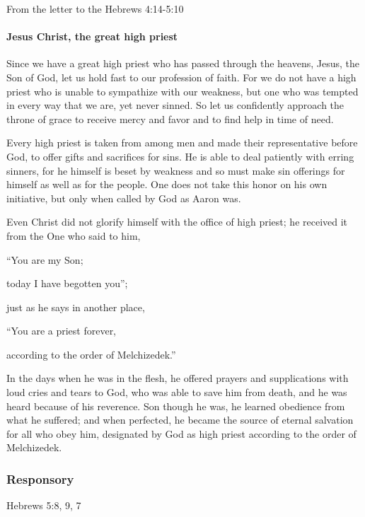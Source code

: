 From the letter to the Hebrews \hfill 4:14-5:10

\paragraph{Jesus Christ, the great high priest}

\lettrine[lines=3]{S}{}ince we have a great high priest who has passed through the heavens, Jesus, the Son of God, let us hold fast to our profession of faith. For we do not have a high priest who is unable to sympathize with our weakness, but one who was tempted in every way that we are, yet never sinned. So let us confidently approach the throne of grace to receive mercy and favor and to find help in time of need.

Every high priest is taken from among men and made their representative before God, to offer gifts and sacrifices for sins. He is able to deal patiently with erring sinners, for he himself is beset by weakness and so must make sin offerings for himself as well as for the people. One does not take this honor on his own initiative, but only when called by God as Aaron was.

Even Christ did not glorify himself with the office of high priest; he received it from the One who said to him,

\vspace{5pt}
   “You are my Son; \par
      today I have begotten you”;

\vspace{5pt}

just as he says in another place,

\vspace{5pt}

   “You are a priest forever,\par
      according to the order of Melchizedek.”

\vspace{5pt}

In the days when he was in the flesh, he offered prayers and supplications with loud cries and tears to God, who was able to save him from death, and he was heard because of his reverence. Son though he was, he learned obedience from what he suffered; and when perfected, he became the source of eternal salvation for all who obey him, designated by God as high priest according to the order of Melchizedek.

\subsubsection{Responsory}
\hfill Hebrews 5:8, 9, 7

